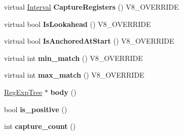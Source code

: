 \begin{DoxyCompactItemize}
\item 
\hypertarget{classv8_1_1internal_1_1_v8___f_i_n_a_l_ac1bfb16ce46192182988ae324c15decf}{}virtual \hyperlink{classv8_1_1internal_1_1_interval}{Interval} {\bfseries Capture\+Registers} () V8\+\_\+\+O\+V\+E\+R\+R\+I\+D\+E\label{classv8_1_1internal_1_1_v8___f_i_n_a_l_ac1bfb16ce46192182988ae324c15decf}

\item 
\hypertarget{classv8_1_1internal_1_1_v8___f_i_n_a_l_a6a4a4a8a2e2c7aca6efde3ee75049c8c}{}virtual bool {\bfseries Is\+Lookahead} () V8\+\_\+\+O\+V\+E\+R\+R\+I\+D\+E\label{classv8_1_1internal_1_1_v8___f_i_n_a_l_a6a4a4a8a2e2c7aca6efde3ee75049c8c}

\item 
\hypertarget{classv8_1_1internal_1_1_v8___f_i_n_a_l_a1303853ed1afec044f4a5c65f06e977b}{}virtual bool {\bfseries Is\+Anchored\+At\+Start} () V8\+\_\+\+O\+V\+E\+R\+R\+I\+D\+E\label{classv8_1_1internal_1_1_v8___f_i_n_a_l_a1303853ed1afec044f4a5c65f06e977b}

\item 
\hypertarget{classv8_1_1internal_1_1_v8___f_i_n_a_l_ac4abdb29d336dc24ef96695ac805b1ac}{}virtual int {\bfseries min\+\_\+match} () V8\+\_\+\+O\+V\+E\+R\+R\+I\+D\+E\label{classv8_1_1internal_1_1_v8___f_i_n_a_l_ac4abdb29d336dc24ef96695ac805b1ac}

\item 
\hypertarget{classv8_1_1internal_1_1_v8___f_i_n_a_l_a0b9dd74bfd4f1172c26a072c44da8669}{}virtual int {\bfseries max\+\_\+match} () V8\+\_\+\+O\+V\+E\+R\+R\+I\+D\+E\label{classv8_1_1internal_1_1_v8___f_i_n_a_l_a0b9dd74bfd4f1172c26a072c44da8669}

\item 
\hypertarget{classv8_1_1internal_1_1_v8___f_i_n_a_l_a7d68da380b730fcd95eb41b943743a8b}{}\hyperlink{classv8_1_1internal_1_1_reg_exp_tree}{Reg\+Exp\+Tree} $\ast$ {\bfseries body} ()\label{classv8_1_1internal_1_1_v8___f_i_n_a_l_a7d68da380b730fcd95eb41b943743a8b}

\item 
\hypertarget{classv8_1_1internal_1_1_v8___f_i_n_a_l_a6507550c119fb2a6b6cc89eb33289f70}{}bool {\bfseries is\+\_\+positive} ()\label{classv8_1_1internal_1_1_v8___f_i_n_a_l_a6507550c119fb2a6b6cc89eb33289f70}

\item 
\hypertarget{classv8_1_1internal_1_1_v8___f_i_n_a_l_a583f446a4ccdbb04a1b8f42e5120a1c3}{}int {\bfseries capture\+\_\+count} ()\label{classv8_1_1internal_1_1_v8___f_i_n_a_l_a583f446a4ccdbb04a1b8f42e5120a1c3}


\end{DoxyCompactItemize}
